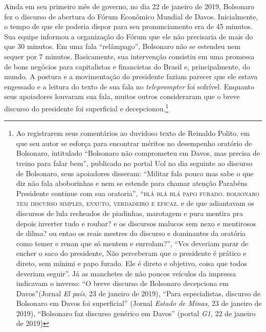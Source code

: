 Ainda em seu primeiro mês de governo, no dia 22 de janeiro de 2019,
Bolsonaro fez o discurso de abertura do Fórum Econômico Mundial de
Davos. Inicialmente, o tempo de que ele poderia dispor para seu
pronunciamento era de 45 minutos. Sua equipe informou a organização do
Fórum que ele não precisaria de mais do que 30 minutos. Em uma fala
``relâmpago'', Bolsonaro não se estendeu nem sequer por 7 minutos.
Basicamente, sua intervenção consistiu em uma promessa de bons negócios
para capitalistas e financistas do Brasil e, principalmente, do mundo. A
postura e a movimentação do presidente faziam parecer que ele estava
engessado e a leitura do texto de sua fala no \emph{teleprompter} foi
sofrível. Enquanto seus apoiadores louvaram sua fala, muitos outros
consideraram que o breve discurso do presidente foi superficial e
decepcionou.\footnote{Ao registrarem seus comentários ao duvidoso texto
  de Reinaldo Polito, em que seu autor se esforça para encontrar méritos
  no desempenho oratório de Bolsonaro, intitulado ``Bolsonaro não
  comprometeu em Davos, mas precisa de treino para falar bem'',
  publicado no portal Uol no dia seguinte ao discurso de Bolsonaro, seus
  apoiadores disseram: ``Militar fala pouco mas sabe o que diz não fala
  aboborinhas e nem se estende para chamar atenção Parabéns Presidente
  continue com sua oratoria'', ``\textsc{blá blá blá papo furado. bolsonaro tem
    discurso simples, enxuto, verdadeiro e eficaz}. e de que adiantavam os
  discursos de lula recheados de piadinhas, marotagem e pura mentira pra
  depois inverter tudo e roubar? e os discursos malucos sem nexo e
  mentirosos de dilma? ou entao os reais mestres do discurso e
  dominantes da oratória como temer e renan que só mentem e enrrolam?'',
  ``Vcs deveriam parar de encher o saco do presidente, Não perceberam
  que o presidente é prático e direto, sem mínimi e papo furado. Ele é
  direto e objetivo, coisa que todos deveriam seguir''. Já as manchetes
  de não poucos veículos da impressa indicavam o inverso: ``O breve
  discurso de Bolsonaro decepciona em Davos''(Jornal \emph{El país}, 23
  de janeiro de 2019), ``Para especialistas, discurso de Bolsonaro em
  Davos foi superficial'' (Jornal \emph{Estado de Minas}, 23 de janeiro
  de 2019), ``Bolsonaro faz discurso genérico em Davos'' (portal
  \emph{G1}, 22 de janeiro de 2019)}

